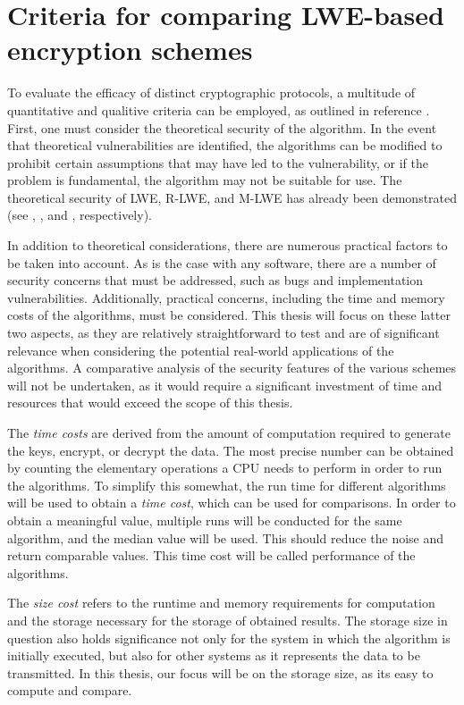 \section{Criteria for comparing LWE-based encryption schemes}
\label{sec:LweComparisonCriteria}

To evaluate the efficacy of distinct cryptographic protocols, a multitude of quantitative and qualitive criteria can be employed, as outlined in reference \cite{CryptoMetrics}. First, one must consider the theoretical security of the algorithm. In the event that theoretical vulnerabilities are identified, the algorithms can be modified to prohibit certain assumptions that may have led to the vulnerability, or if the problem is fundamental, the algorithm may not be suitable for use. The theoretical security of LWE, R-LWE, and M-LWE has already been demonstrated (see \cite{Regev2005OnLL}, \cite{RLWEproof}, and \cite{MLWEproof}, respectively).

In addition to theoretical considerations, there are numerous practical factors to be taken into account. As is the case with any software, there are a number of security concerns that must be addressed, such as bugs and implementation vulnerabilities. Additionally, practical concerns, including the time and memory costs of the algorithms, must be considered. This thesis will focus on these latter two aspects, as they are relatively straightforward to test and are of significant relevance when considering the potential real-world applications of the algorithms. A comparative analysis of the security features of the various schemes will not be undertaken, as it would require a significant investment of time and resources that would exceed the scope of this thesis.

The \textit{time costs} are derived from the amount of computation required to generate the keys, encrypt, or decrypt the data. The most precise number can be obtained by counting the elementary operations a CPU needs to perform in order to run the algorithms. To simplify this somewhat, the run time for different algorithms will be used to obtain a \textit{time cost}, which can be used for comparisons. In order to obtain a meaningful value, multiple runs will be conducted for the same algorithm, and the median value will be used. This should reduce the noise and return comparable values. This time cost will be called performance of the algorithms.

The \textit{size cost} refers to the runtime and memory requirements for computation and the storage necessary for the storage of obtained results. The storage size in question also holds significance not only for the system in which the algorithm is initially executed, but also for other systems as it represents the data to be transmitted. In this thesis, our focus will be on the storage size, as its easy to compute and compare.

